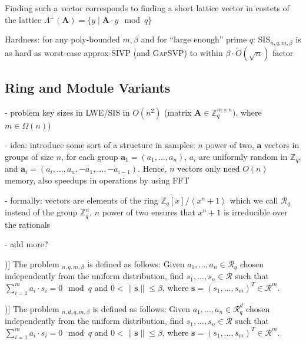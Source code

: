 \documentclass[
  a4paper,  %
  twoside,  %
  bibliography=totoc,
  headsepline,
  cleardoublepage=empty,
  parskip=half,
  draft=false
]{scrbook}
\begin{document}
Finding such a vector corresponds to finding a short lattice vector in costets of the lattice $\Lambda^{\perp}(\textbf{A}) = \{ y \mid \textbf{A} \cdot y \mod q \}$ %

Hardness: for any poly-bounded $m, \beta$ and for ``large enough'' prime $q$: SIS$_{n, q, m, \beta}$ is as hard as worst-case approx-SIVP (and \textsc{GapSVP}) to within $\beta \cdot \tilde{O}(\sqrt{n})$ factor 

\subsection{Ring and Module Variants} 
- problem key sizes in LWE/SIS in $O(n^2)$ (matrix $\textbf{A} \in \mathbb{Z}_q^{m \times n})$, where $m \in \Omega(n)$)%

- idea: introduce some sort of a structure in samples: $n$ power of two, $\textbf{a}$ vectors in groups of size $n$, for each group $\textbf{a}_1 = (a_1, ..., a_n)$, $a_i$ are uniformly random in $\mathbb{Z}_q$, and $\textbf{a}_i = (a_i, ..., a_n, -a_1, ..., -a_{i-1})$. Hence, $n$ vectors only need $O(n)$ memory, also speedups in operations by using FFT %

- formally: vectors are elements of the ring $\mathbb{Z}_q\left[x\right] / \left\langle x^n + 1 \right\rangle$ which we call $\mathcal{R}_q$ instead of the group $\mathbb{Z}_q^n$, $n$ power of two ensures that $x^n + 1$ is irreducible over the rationals%

- add more? %

\begin{definition}[Ring-SIS Problem [\citealp{LS15}, Definition 3.3])]
  The problem $_{n, q, m, \beta}$ is defined as follows: Given $a_1, ..., a_n \in \mathcal{R}_q$ chosen independently from the uniform distribution, find $s_1, ..., s_n \in \mathcal{R}$ such that $\sum_{i=1}^m a_i \cdot s_i = 0 \mod q$ and $0 < \| \textbf{s}\| \leq \beta$, where $\textbf{s} = (s_1, ..., s_m)^T \in \mathcal{R}^m$.
\end{definition} %

\begin{definition}[Module-SIS Problem [\citealp{LS15}, Definition 3.3])]
  The problem $_{n, d, q, m, \beta}$ is defined as follows: Given $a_1, ..., a_n \in \mathcal{R}_q^d$ chosen independently from the uniform distribution, find $s_1, ..., s_n \in \mathcal{R}$ such that $\sum_{i=1}^m a_i \cdot s_i = 0\mod q$ and $0 < \| \textbf{s}\| \leq \beta$, where $\textbf{s} = (s_1, ..., s_m)^T \in \mathcal{R}^m$.
\end{definition} %
\end{document}
